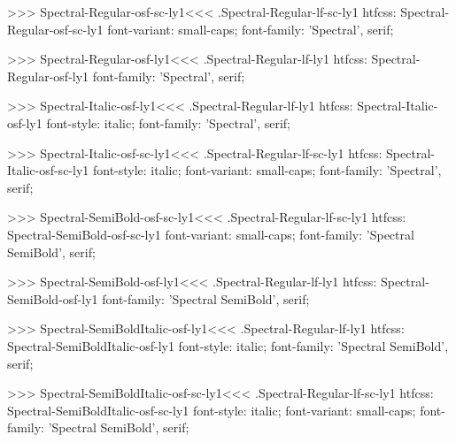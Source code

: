 >>>
\<Spectral-Regular-osf-sc-ly1\><<<
.Spectral-Regular-lf-sc-ly1
htfcss:  Spectral-Regular-osf-sc-ly1  font-variant: small-caps; font-family: 'Spectral', serif;

>>>
\<Spectral-Regular-osf-ly1\><<<
.Spectral-Regular-lf-ly1
htfcss:  Spectral-Regular-osf-ly1  font-family: 'Spectral', serif;

>>>
\<Spectral-Italic-osf-ly1\><<<
.Spectral-Regular-lf-ly1
htfcss:  Spectral-Italic-osf-ly1  font-style: italic; font-family: 'Spectral', serif;

>>>
\<Spectral-Italic-osf-sc-ly1\><<<
.Spectral-Regular-lf-sc-ly1
htfcss:  Spectral-Italic-osf-sc-ly1  font-style: italic; font-variant: small-caps; font-family: 'Spectral', serif;

>>>
\<Spectral-SemiBold-osf-sc-ly1\><<<
.Spectral-Regular-lf-sc-ly1
htfcss:  Spectral-SemiBold-osf-sc-ly1  font-variant: small-caps; font-family: 'Spectral SemiBold', serif;

>>>
\<Spectral-SemiBold-osf-ly1\><<<
.Spectral-Regular-lf-ly1
htfcss:  Spectral-SemiBold-osf-ly1  font-family: 'Spectral SemiBold', serif;

>>>
\<Spectral-SemiBoldItalic-osf-ly1\><<<
.Spectral-Regular-lf-ly1
htfcss:  Spectral-SemiBoldItalic-osf-ly1  font-style: italic; font-family: 'Spectral SemiBold', serif;

>>>
\<Spectral-SemiBoldItalic-osf-sc-ly1\><<<
.Spectral-Regular-lf-sc-ly1
htfcss:  Spectral-SemiBoldItalic-osf-sc-ly1  font-style: italic; font-variant: small-caps; font-family: 'Spectral SemiBold', serif;

